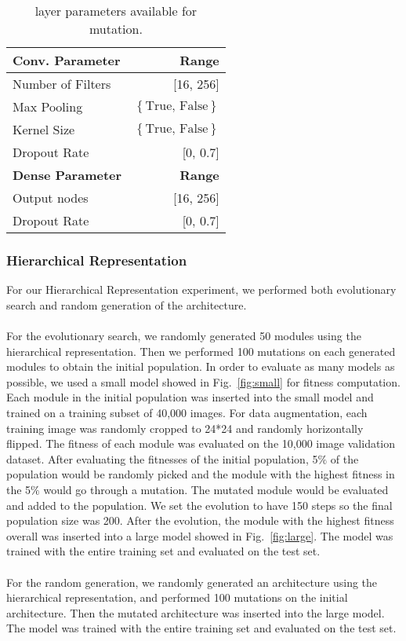 \documentclass[11pt]{article}
\begin{document}
\begin{table}[h]
\begin{center}
\begin{tabular}{|l|r|} \hline
{\bf Conv. Parameter} & {\bf Range} \\ \hline
Number of Filters & [16, 256] \\
Max Pooling & $\left\{\mbox{True, False}\right\}$ \\
Kernel Size & $\left\{\mbox{True, False}\right\}$ \\
Dropout Rate & [0, 0.7] \\ \hline
{\bf Dense Parameter} & {\bf Range} \\ \hline
Output nodes & [16, 256] \\
Dropout Rate & [0, 0.7] \\ \hline
\end{tabular}
\caption{layer parameters available for mutation.}
\label{table:layerparam}
\end{center}
\end{table}

\subsubsection{Hierarchical Representation}
	For our Hierarchical Representation experiment, we performed both evolutionary search and random generation of the architecture. \\
    \\For the evolutionary search, we randomly generated 50 modules using the hierarchical representation. Then we performed 100 mutations on each generated modules to obtain the initial population. In order to evaluate as many models as possible, we used a small model showed in Fig.~\ref{fig:small} for fitness computation. Each module in the initial population was inserted into the small model and trained on a training subset of 40,000 images. For data augmentation, each training image was randomly cropped to 24*24 and randomly horizontally flipped. The fitness of each module was evaluated on the 10,000 image validation dataset. After evaluating the fitnesses of the initial population, 5$\%$ of the population would be randomly picked and the module with the highest fitness in the 5$\%$ would go through a mutation. The mutated module would be evaluated and added to the population. We set the evolution to have 150 steps so the final population size was 200. After the evolution, the module with the highest fitness overall was inserted into a large model showed in Fig.~\ref{fig:large}. The model was trained with the entire training set and evaluated on the test set. \\
    \\For the random generation, we randomly generated an architecture using the hierarchical representation, and performed 100 mutations on the initial architecture. Then the mutated architecture was inserted into the large model. The model was trained with the entire training set and evaluated on the test set.\\
\end{document}

